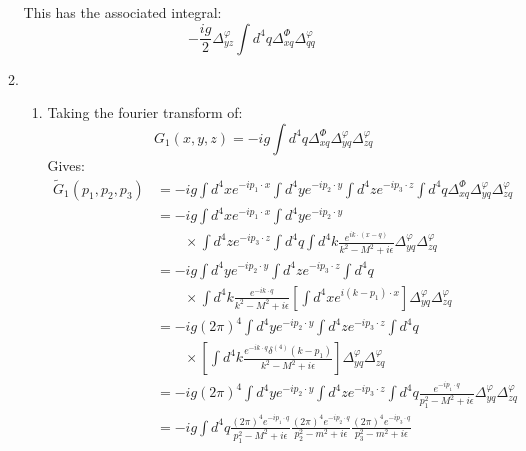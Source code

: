 \documentclass[12pt,a4]{article}
\begin{document}
\begin{enumerate}
\begin{enumerate}
        This has the associated integral:
        \begin{equation*}
          -\frac{ig}{2}\Delta^{\varphi}_{yz}\int d^4 q\Delta^{\Phi}_{xq} \Delta^{\varphi}_{qq}
        \end{equation*}
      \item
        \begin{enumerate}
          \item
            Taking the fourier transform of:
            \begin{equation*}
              G_1(x, y, z) = -ig\int d^4 q\Delta^{\Phi}_{xq} \Delta^{\varphi}_{yq}\Delta^{\varphi}_{zq}
            \end{equation*}
            Gives:
            \begin{align*}
              \tilde G_1(p_1, p_2, p_3) &= -ig\int d^4x e^{-i p_1\cdot x}\int d^4y e^{-i p_2\cdot y}\int d^4z e^{-i p_3\cdot z}\int d^4 q\Delta^{\Phi}_{xq} \Delta^{\varphi}_{yq}\Delta^{\varphi}_{zq}\\
                                        &= -ig\int d^4x e^{-i p_1 \cdot x}\int d^4y e^{-i p_2\cdot y}\\
                                        & \qquad \times \int d^4z e^{-i p_3\cdot z}\int d^4 q\int d^4 k \frac{e^{ik\cdot (x - q)}}{k^2 - M^2 + i \epsilon} \Delta^{\varphi}_{yq}\Delta^{\varphi}_{zq}\\
                                        &= -ig\int d^4y e^{-i p_2\cdot y}\int d^4z e^{-i p_3\cdot z}\int d^4 q\\
                                        & \qquad \times \int d^4 k \frac{e^{-ik\cdot  q}}{k^2 - M^2 + i \epsilon}\left[\int d^4x e^{i(k - p_1)\cdot x} \right]\Delta^{\varphi}_{yq}\Delta^{\varphi}_{zq}\\
                                        &= -ig(2 \pi)^4\int d^4y e^{-i p_2\cdot y}\int d^4z e^{-i p_3\cdot z}\int d^4 q\\
                                        &\qquad \times \left[\int d^4 k \frac{e^{-ik\cdot  q}\delta^{(4)}(k - p_1)}{k^2 - M^2 + i \epsilon}\right] \Delta^{\varphi}_{yq}\Delta^{\varphi}_{zq}\\
                                        &= -ig(2 \pi)^4\int d^4y e^{-i p_2\cdot y}\int d^4z e^{-i p_3\cdot z}\int d^4 q \frac{e^{-ip_1\cdot  q}}{p_1^2 - M^2 + i \epsilon} \Delta^{\varphi}_{yq}\Delta^{\varphi}_{zq}\\
                                        &= -ig \int d^4 q \frac{(2 \pi)^{4}e^{-ip_1\cdot  q}}{p_1^2 - M^2 + i \epsilon} \frac{(2 \pi)^{4}e^{-ip_2\cdot  q}}{p_2^2 - m^2 + i \epsilon}\frac{(2 \pi)^{4}e^{-ip_3\cdot  q}}{p_3^2 - m^2 + i \epsilon}\\

\end{align*}
\end{enumerate}
\end{enumerate}
\end{enumerate}
\end{document}
